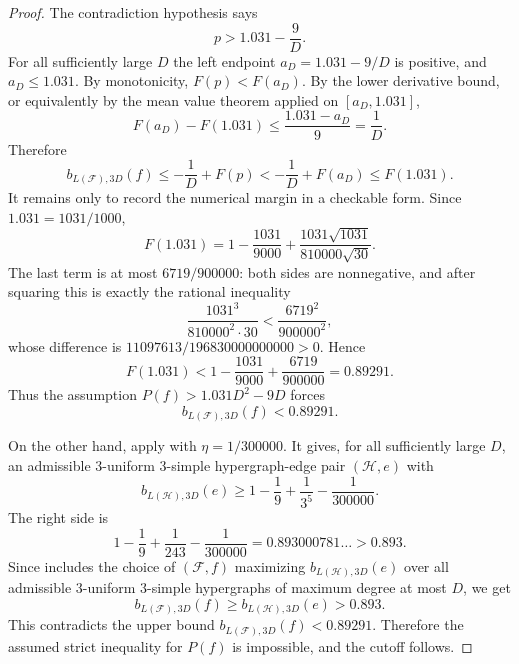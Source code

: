 \begin{proof}
The contradiction hypothesis says
\[
p>1.031-\frac9D.
\]
For all sufficiently large $D$ the left endpoint
$a_D=1.031-9/D$ is positive, and $a_D\le 1.031$.  By monotonicity,
$F(p)<F(a_D)$.  By the lower derivative bound, or equivalently by the mean
value theorem applied on $[a_D,1.031]$,
\[
F(a_D)-F(1.031)\le \frac{1.031-a_D}{9}=\frac1D.
\]
Therefore
\[
b_{L(\mathcal F),3D}(f)
\le -\frac1D+F(p)
< -\frac1D+F(a_D)
\le F(1.031).
\]
It remains only to record the numerical margin in a checkable form.  Since
$1.031=1031/1000$,
\[
F(1.031)
=1-\frac{1031}{9000}
  +\frac{1031\sqrt{1031}}{810000\sqrt{30}}.
\]
The last term is at most $6719/900000$: both sides are nonnegative, and after
squaring this is exactly the rational inequality
\[
\frac{1031^3}{810000^2\cdot 30}
<
\frac{6719^2}{900000^2},
\]
whose difference is
$11097613/196830000000000>0$.  Hence
\[
F(1.031)
<
1-\frac{1031}{9000}+\frac{6719}{900000}
=0.89291.
\]
Thus the assumption $P(f)>1.031D^2-9D$ forces
\[
b_{L(\mathcal F),3D}(f)<0.89291.
\]

On the other hand, apply
 with
$\eta=1/300000$.  It gives, for all sufficiently large $D$, an admissible
$3$-uniform $3$-simple hypergraph-edge pair $(\mathcal H,e)$ with
\[
b_{L(\mathcal H),3D}(e)\ge
1-\frac19+\frac1{3^5}-\frac1{300000}.
\]
The right side is
\[
1-\frac19+\frac1{243}-\frac1{300000}
=0.893000781\ldots>0.893.
\]
Since  includes the choice of
$(\mathcal F,f)$ maximizing $b_{L(\mathcal H),3D}(e)$ over all admissible
$3$-uniform $3$-simple hypergraphs of maximum degree at most $D$, we get
\[
b_{L(\mathcal F),3D}(f)\ge b_{L(\mathcal H),3D}(e)>0.893.
\]
This contradicts the upper bound
$b_{L(\mathcal F),3D}(f)<0.89291$.  Therefore the assumed strict inequality
for $P(f)$ is impossible, and the cutoff follows.
\end{proof}
